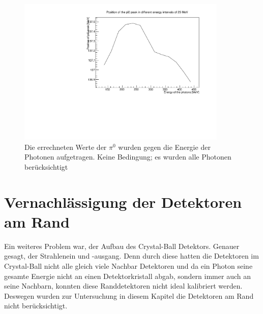\documentclass[a4paper,11pt,oneside,final,german,openbib,pdftex]{scrbook}
\begin{document}
\begin{figure}[h!]
	\begin{center}
		\includegraphics[width=100mm]{RealDataEnergyIntervalAllPhotonsDeviation}
		\caption{Die errechneten Werte der $\pi^0$ wurden gegen die Energie der Photonen aufgetragen. Keine Bedingung; es wurden alle Photonen ber\"ucksichtigt}
		\label{fig:Energy-Intervall-No-Condition-Deviation-1303}
	\end{center}
\end{figure}

\section{Vernachl\"assigung der Detektoren am Rand}
\label{sec:Varnachlaessigung-der-Detektoren-am-Rand}

Ein weiteres Problem war, der Aufbau des Crystal-Ball Detektors. Genauer gesagt, der Strahlenein und -ausgang. Denn durch diese hatten die Detektoren im Crystal-Ball nicht alle gleich viele Nachbar Detektoren und da ein Photon seine gesamte Energie nicht an einen Detektorkristall abgab, sondern immer auch an seine Nachbarn, konnten diese Randdetektoren nicht ideal kalibriert werden. Deswegen wurden zur Untersuchung in diesem Kapitel die Detektoren am Rand nicht ber\"ucksichtigt. 

\end{document}
